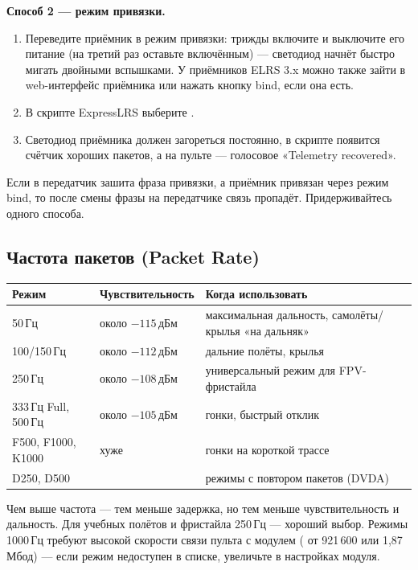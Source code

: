 \textbf{Способ 2 --- режим привязки.}
\begin{enumerate}
  \item Переведите приёмник в режим привязки: трижды включите и выключите его питание
        (на третий раз оставьте включённым) --- светодиод начнёт быстро мигать двойными
        вспышками. У приёмников ELRS 3.x можно также зайти в web-интерфейс приёмника или
        нажать кнопку bind, если она есть.
  \item В скрипте ExpressLRS выберите \menu{[Bind]}.
  \item Светодиод приёмника должен загореться постоянно, в скрипте появится счётчик
        хороших пакетов, а на пульте --- голосовое «Telemetry recovered».
\end{enumerate}

\begin{caution}
Если в передатчик зашита фраза привязки, а приёмник привязан через режим bind, то после
смены фразы на передатчике связь пропадёт. Придерживайтесь одного способа.
\end{caution}

\subsection{Частота пакетов (Packet Rate)}

\begin{center}\small
\renewcommand{\arraystretch}{1.15}
\begin{tabularx}{\linewidth}{@{}p{30mm}p{28mm}X@{}}
\toprule
Режим & Чувствительность & Когда использовать \\
\midrule
50\,Гц & около $-115$\,дБм & максимальная дальность, самолёты/крылья «на дальняк» \\
100/150\,Гц & около $-112$\,дБм & дальние полёты, крылья \\
250\,Гц & около $-108$\,дБм & универсальный режим для FPV-фристайла \\
333\,Гц Full, 500\,Гц & около $-105$\,дБм & гонки, быстрый отклик \\
F500, F1000, K1000 & хуже & гонки на короткой трассе \\
D250, D500 & & режимы с повтором пакетов (DVDA) \\
\bottomrule
\end{tabularx}
\end{center}

Чем выше частота --- тем меньше задержка, но тем меньше чувствительность и дальность.
Для учебных полётов и фристайла 250\,Гц --- хороший выбор. Режимы 1000\,Гц требуют высокой
скорости связи пульта с модулем ( от 921\,600 или 1,87\,Мбод) --- если
режим недоступен в списке, увеличьте  в настройках модуля.

